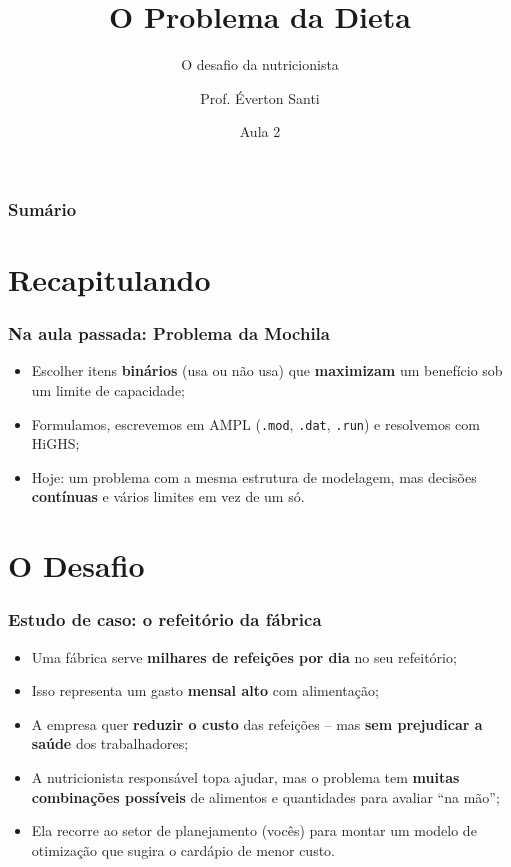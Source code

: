 \documentclass[fleqn]{beamer}
\title[Aula 2 -- Problema da Dieta]{O Problema da Dieta}
\subtitle{O desafio da nutricionista}
\author[Santi]{Prof. \'Everton Santi}
\institute[UFRN/ECT]{ECT2524 -- Introdução à Otimização \\ Escola de Ciências e Tecnologia -- UFRN}
\date{Aula 2}
\begin{document}
\begin{frame}
	\titlepage
\end{frame}

\begin{frame}
	\frametitle{Sumário}
	\tableofcontents
\end{frame}

\section{Recapitulando}

\begin{frame}
	\frametitle{Na aula passada: Problema da Mochila}
	\begin{itemize}
		\item Escolher itens \textbf{binários} (usa ou não usa) que
			\textbf{maximizam} um benefício sob um limite de capacidade;
		\item Formulamos, escrevemos em AMPL (\texttt{.mod}, \texttt{.dat},
			\texttt{.run}) e resolvemos com HiGHS;
		\item Hoje: um problema com a mesma estrutura de modelagem, mas
			decisões \textbf{contínuas} e vários limites em vez de um só.
	\end{itemize}
\end{frame}

\section{O Desafio}

\begin{frame}
	\frametitle{Estudo de caso: o refeitório da fábrica}
	\begin{itemize}
		\item Uma fábrica serve \textbf{milhares de refeições por dia}
			no seu refeitório;
		\item Isso representa um gasto \textbf{mensal alto} com
			alimentação;
		\item A empresa quer \textbf{reduzir o custo} das refeições --
			mas \textbf{sem prejudicar a saúde} dos trabalhadores;
		\item A nutricionista responsável topa ajudar, mas o problema
			tem \textbf{muitas combinações possíveis} de alimentos e
			quantidades para avaliar ``na mão'';
		\item Ela recorre ao setor de planejamento (vocês) para montar
			um modelo de otimização que sugira o cardápio de menor
			custo.
	\end{itemize}
\end{frame}
\end{document}

